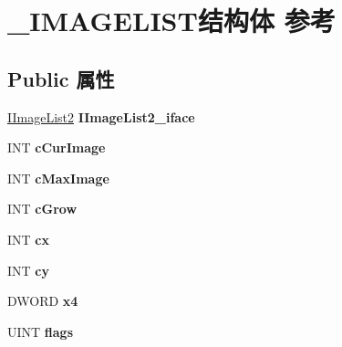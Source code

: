 \hypertarget{struct___i_m_a_g_e_l_i_s_t}{}\section{\+\_\+\+I\+M\+A\+G\+E\+L\+I\+S\+T结构体 参考}
\label{struct___i_m_a_g_e_l_i_s_t}
\subsection*{Public 属性}
\begin{DoxyCompactItemize}
\item 
\mbox{\label{struct___i_m_a_g_e_l_i_s_t_a8f607c8eb26af17f28d3de1d9b11e1b8}} 
\hyperlink{interface_i_image_list2}{I\+Image\+List2} {\bfseries I\+Image\+List2\+\_\+iface}
\item 
\mbox{\label{struct___i_m_a_g_e_l_i_s_t_a5069dabb41c31dc32135d073a5ce35ad}} 
I\+NT {\bfseries c\+Cur\+Image}
\item 
\mbox{\label{struct___i_m_a_g_e_l_i_s_t_a228a7e261fdd976fc2db59f441f96b50}} 
I\+NT {\bfseries c\+Max\+Image}
\item 
\mbox{\label{struct___i_m_a_g_e_l_i_s_t_a09a86b17e085f0bce69d9ed42bcbcdfd}} 
I\+NT {\bfseries c\+Grow}
\item 
\mbox{\label{struct___i_m_a_g_e_l_i_s_t_afe6b73712f73380ed936bb369c31ba84}} 
I\+NT {\bfseries cx}
\item 
\mbox{\label{struct___i_m_a_g_e_l_i_s_t_aa50ca33d24635cc8b55bad646b591bbe}} 
I\+NT {\bfseries cy}
\item 
\mbox{\label{struct___i_m_a_g_e_l_i_s_t_ad90fc32da8fa655f2e445e984000ce84}} 
D\+W\+O\+RD {\bfseries x4}
\item 
\mbox{\label{struct___i_m_a_g_e_l_i_s_t_ac2e1b141177ac7cb50d927d2d211a1a4}} 
U\+I\+NT {\bfseries flags}
\item 
\mbox{\label{struct___i_m_a_g_e_l_i_s_t_a9a497f9b539194a176254732b5908e60}} 

\end{DoxyCompactItemize}
